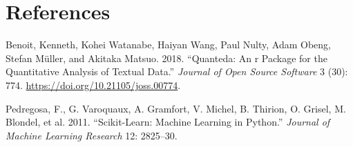 \documentclass[
  letterpaper,
  DIV=11,
  numbers=noendperiod]{scrreprt}
\newlength{\cslhangindent}
\newenvironment{CSLReferences}[2] %
 {\begin{list}{}{%
  \setlength{\itemindent}{0pt}
  \setlength{\leftmargin}{0pt}
  \setlength{\parsep}{0pt}
  \ifodd #1
   \setlength{\leftmargin}{\cslhangindent}
   \setlength{\itemindent}{-1\cslhangindent}
  \fi
  \setlength{\itemsep}{#2\baselineskip}}}
 {\end{list}}
\begin{document}

\chapter*{References}\label{references}


\label{refs}
\begin{CSLReferences}{1}{0}
Benoit, Kenneth, Kohei Watanabe, Haiyan Wang, Paul Nulty, Adam Obeng,
Stefan Müller, and Akitaka Matsuo. 2018. {``Quanteda: An r Package for
the Quantitative Analysis of Textual Data.''} \emph{Journal of Open
Source Software} 3 (30): 774. \url{https://doi.org/10.21105/joss.00774}.

Pedregosa, F., G. Varoquaux, A. Gramfort, V. Michel, B. Thirion, O.
Grisel, M. Blondel, et al. 2011. {``Scikit-Learn: Machine Learning in
{P}ython.''} \emph{Journal of Machine Learning Research} 12: 2825--30.

\end{CSLReferences}
\end{document}
